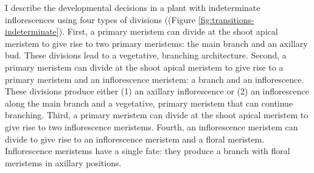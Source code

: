 \documentclass[12pt, oneside]{article}   	%
\begin{document}
I describe the developmental decisions in a plant with indeterminate inflorescences using four types of divisions ((Figure \ref{fig:transitions-indeterminate}). First, a primary meristem can divide at the shoot apical meristem to give rise to two primary meristems: the main branch and an axillary bud. These divisions lead to a vegetative, branching architecture. Second, a primary meristem can divide at the shoot apical meristem to give rise to a primary meristem and an inflorescence meristem: a branch and an inflorescence. These divisions  produce either (1) an axillary inflorescence or (2) an inflorescence along the main branch and a vegetative, primary meristem that can continue branching. Third, a primary meristem can divide at the shoot apical meristem to give rise to two inflorescence meristems. Fourth, an inflorescence meristem can divide to give rise to an inflorescence meristem and a floral meristem. Inflorescence meristems have a single fate: they produce a branch with floral meristems in axillary positions.
\end{document}
